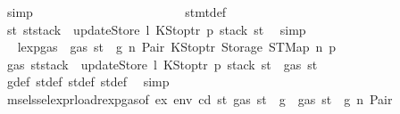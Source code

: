 \begin{isabellebody}
\ simp\isanewline
\ \ \ \ \ \ \ \ \ \ \ \ \ \ \ \ \ \ \ \ \ \ \isamarkupfalse%
\ stmt{\isacharunderscore}{\kern0pt}def\ \isamarkupfalse%
\ {\isachardoublequoteopen}st{}{\isacharprime}{\kern0pt}{\isacharequal}{\kern0pt}\ st{\isacharprime}{\kern0pt}{\isacharprime}{\kern0pt}{\isacharprime}{\kern0pt}{\isasymlparr}stack\ {\isacharcolon}{\kern0pt}{\isacharequal}{\kern0pt}\ updateStore\ l\ {\isacharparenleft}{\kern0pt}KStoptr\ p{\isacharparenright}{\kern0pt}\ {\isacharparenleft}{\kern0pt}stack\ st{\isacharprime}{\kern0pt}{\isacharprime}{\kern0pt}{\isacharprime}{\kern0pt}{\isacharparenright}{\kern0pt}{\isasymrparr}{\isachardoublequoteclose}\ \isamarkupfalse%
\ simp\isanewline
\ \ \ \ \ \ \ \ \ \ \ \ \ \ \ \ \ \ \ \ \ \ \isamarkupfalse%
\ \isamarkupfalse%
\ lexp{\isacharunderscore}{\kern0pt}gas\ {\isacharbackquoteopen}{\isasymnot}\ gas\ st\ {\isasymle}\ g{\isacharbackquoteclose}\ n\ Pair\ KStoptr\ Storage\ STMap\ n{}\ p{}\ \isamarkupfalse%
\ {\isachardoublequoteopen}gas\ {\isacharparenleft}{\kern0pt}st{\isacharprime}{\kern0pt}{\isacharprime}{\kern0pt}{\isacharprime}{\kern0pt}{\isasymlparr}stack\ {\isacharcolon}{\kern0pt}{\isacharequal}{\kern0pt}\ updateStore\ l\ {\isacharparenleft}{\kern0pt}KStoptr\ p{\isacharparenright}{\kern0pt}\ {\isacharparenleft}{\kern0pt}stack\ st{\isacharprime}{\kern0pt}{\isacharprime}{\kern0pt}{\isacharprime}{\kern0pt}{\isacharparenright}{\kern0pt}{\isasymrparr}{\isacharparenright}{\kern0pt}\ {\isasymle}\ gas\ st{\isacharprime}{\kern0pt}{\isacharprime}{\kern0pt}{\isachardoublequoteclose}\ \isamarkupfalse%
\ g{\isacharunderscore}{\kern0pt}def\ st{\isacharprime}{\kern0pt}{\isacharunderscore}{\kern0pt}def\ st{\isacharprime}{\kern0pt}{\isacharprime}{\kern0pt}{\isacharunderscore}{\kern0pt}def\ st{\isacharprime}{\kern0pt}{\isacharprime}{\kern0pt}{\isacharprime}{\kern0pt}{\isacharunderscore}{\kern0pt}def\ \isamarkupfalse%
\ simp\isanewline
\ \ \ \ \ \ \ \ \ \ \ \ \ \ \ \ \ \ \ \ \ \ \isamarkupfalse%
\ \isamarkupfalse%
\ msel{\isacharunderscore}{\kern0pt}ssel{\isacharunderscore}{\kern0pt}expr{\isacharunderscore}{\kern0pt}load{\isacharunderscore}{\kern0pt}rexp{\isacharunderscore}{\kern0pt}gas{\isacharparenleft}{\kern0pt}{}{\isacharparenright}{\kern0pt}{\isacharbrackleft}{\kern0pt}of\ ex\ env\ cd\ st{\isacharprime}{\kern0pt}\ {\isachardoublequoteopen}gas\ st\ {\isacharminus}{\kern0pt}\ g{\isachardoublequoteclose}{\isacharbrackright}{\kern0pt}\ {\isacharbackquoteopen}{\isasymnot}\ gas\ st\ {\isasymle}\ g{\isacharbackquoteclose}\ n\ Pair\ \isamarkupfalse%

\end{isabellebody}
